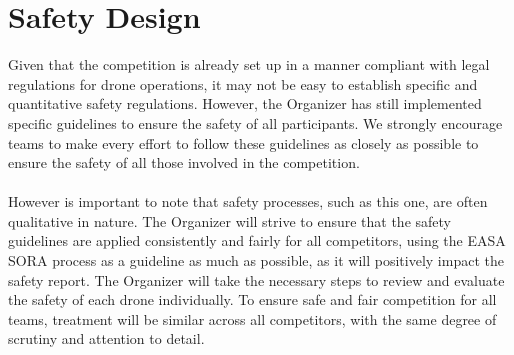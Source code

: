 \documentclass{article}
\begin{document}
\section{Safety Design}
Given that the competition is already set up in a manner compliant with legal regulations for drone operations, it may not be easy to establish specific and quantitative safety regulations. However, the Organizer has still implemented specific guidelines to ensure the safety of all participants. We strongly encourage teams to make every effort to follow these guidelines as closely as possible to ensure the safety of all those involved in the competition. 
\\ \\ 
However is important to note that safety processes, such as this one, are often qualitative in nature. The Organizer will strive to ensure that the safety guidelines are applied consistently and fairly for all competitors, using the EASA SORA process as a guideline as much as possible, as it will positively impact the safety report. The Organizer will take the necessary steps to review and evaluate the safety of each drone individually. To ensure safe and fair competition for all teams,   treatment will be similar across all competitors, with the same degree of scrutiny and attention to detail.
\end{document}
